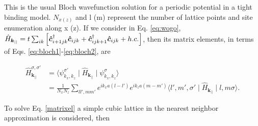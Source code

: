 \documentclass[10pt,prb,showpacs,amssymb,floatfix]{revtex4-1}
\newcommand{\dg}{\dagger}
\newcommand{\nn}{\nonumber}
\newcommand{\sg}{\sigma}
\newcommand{\h}{\hat}
\begin{document}
This is the usual Bloch wavefunction solution for a periodic potential in a tight binding model. $N_{x(z)}$ and l (m) represent the number of lattice points and site enumeration along x (z). If we consider in Eq. \eqref{eq:wogo}, $\h H_{{\bm k}_{||}}= t\sum_{ik}  \Big{[} \bm{\h c}^{\dg}_{i+1jk} \bm{\h c}_{ijk}+ \bm{\h c}^{\dg}_{ijk+1} \bm{\h c}_{ijk}  + h.c. \Big{]}$, then its matrix elements, in terms of Eqs. \eqref{eq:bloch1}-\eqref{eq:bloch2}, are

\begin{align}
\h H^{\sg,\sg'}_{{\bm k}_{||}}&=\langle \psi_{k_x,k_z}^{\sg'} \mid \h H_{{\bm k}_{||}} \mid \psi_{k_x,k_z}^\sg \rangle  \nn\\
&=\frac{1}{N_x N_z} \sum_{ll',mm'} e^{ik_x a(l-l')}e^{ik_z a(m-m')} \langle l',m',\sg' \mid \h H_{{\bm k}_{||}} \mid l,m \sg \rangle.
\label{matrixel}
\end{align}

To solve Eq. \eqref{matrixel} a simple cubic lattice in the nearest neighbor approximation is considered, then
\end{document}
